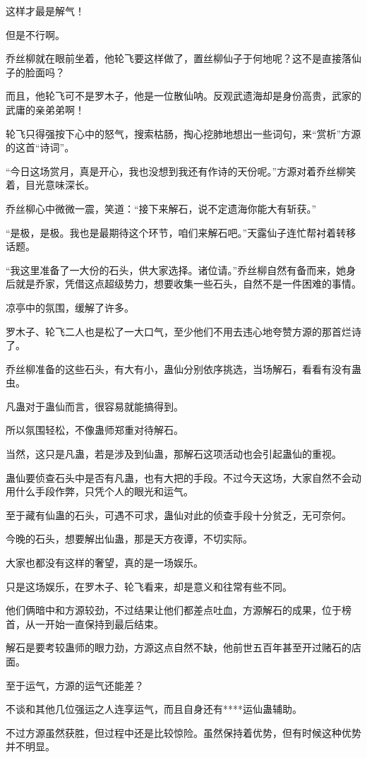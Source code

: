 \begin{this_body}
这样才最是解气！

但是不行啊。

乔丝柳就在眼前坐着，他轮飞要这样做了，置丝柳仙子于何地呢？这不是直接落仙子的脸面吗？

而且，他轮飞可不是罗木子，他是一位散仙呐。反观武遗海却是身份高贵，武家的武庸的亲弟弟啊！

轮飞只得强按下心中的怒气，搜索枯肠，掏心挖肺地想出一些词句，来“赏析”方源的这首“诗词”。

“今日这场赏月，真是开心，我也没想到我还有作诗的天份呢。”方源对着乔丝柳笑着，目光意味深长。

乔丝柳心中微微一震，笑道：“接下来解石，说不定遗海你能大有斩获。”

“是极，是极。我也是最期待这个环节，咱们来解石吧。”天露仙子连忙帮衬着转移话题。

“我这里准备了一大份的石头，供大家选择。诸位请。”乔丝柳自然有备而来，她身后就是乔家，凭借这点超级势力，想要收集一些石头，自然不是一件困难的事情。

凉亭中的氛围，缓解了许多。

罗木子、轮飞二人也是松了一大口气，至少他们不用去违心地夸赞方源的那首烂诗了。

乔丝柳准备的这些石头，有大有小，蛊仙分别依序挑选，当场解石，看看有没有蛊虫。

凡蛊对于蛊仙而言，很容易就能搞得到。

所以氛围轻松，不像蛊师郑重对待解石。

当然，这只是凡蛊，若是涉及到仙蛊，那解石这项活动也会引起蛊仙的重视。

蛊仙要侦查石头中是否有凡蛊，也有大把的手段。不过今天这场，大家自然不会动用什么手段作弊，只凭个人的眼光和运气。

至于藏有仙蛊的石头，可遇不可求，蛊仙对此的侦查手段十分贫乏，无可奈何。

今晚的石头，想要解出仙蛊，那是天方夜谭，不切实际。

大家也都没有这样的奢望，真的是一场娱乐。

只是这场娱乐，在罗木子、轮飞看来，却是意义和往常有些不同。

他们俩暗中和方源较劲，不过结果让他们都差点吐血，方源解石的成果，位于榜首，从一开始一直保持到最后结束。

解石是要考较蛊师的眼力劲，方源这点自然不缺，他前世五百年甚至开过赌石的店面。

至于运气，方源的运气还能差？

不谈和其他几位强运之人连享运气，而且自身还有****运仙蛊辅助。

不过方源虽然获胜，但过程中还是比较惊险。虽然保持着优势，但有时候这种优势并不明显。


\end{this_body}
